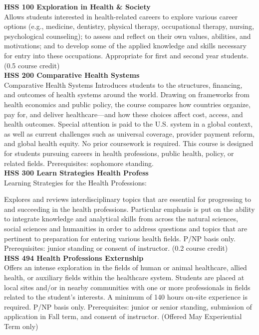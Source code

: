 \documentclass[
  letterpaper,
]{scrbook}
\begin{document}
\textbf{HSS 100 Exploration in Health \& Society}\\
Allows students interested in health-related careers to explore various
career options (e.g., medicine, dentistry, physical therapy,
occupational therapy, nursing, psychological counseling); to assess and
reflect on their own values, abilities, and motivations; and to develop
some of the applied knowledge and skills necessary for entry into these
occupations. Appropriate for first and second year students. (0.5 course
credit)\\
\textbf{HSS 200 Comparative Health Systems}\\
Comparative Health Systems Introduces students to the structures,
financing, and outcomes of health systems around the world. Drawing on
frameworks from health economics and public policy, the course compares
how countries organize, pay for, and deliver healthcare---and how these
choices affect cost, access, and health outcomes. Special attention is
paid to the U.S. system in a global context, as well as current
challenges such as universal coverage, provider payment reform, and
global health equity. No prior coursework is required. This course is
designed for students pursuing careers in health professions, public
health, policy, or related fields. Prerequisites: sophomore standing.\\
\textbf{HSS 300 Learn Strategies Health Profess}\\
Learning Strategies for the Health Professions:

Explores and reviews interdisciplinary topics that are essential for
progressing to and succeeding in the health professions. Particular
emphasis is put on the ability to integrate knowledge and analytical
skills from across the natural sciences, social sciences and humanities
in order to address questions and topics that are pertinent to
preparation for entering various health fields. P/NP basis only.
Prerequisites: junior standing or consent of instructor. (0.2 course
credit)\\
\textbf{HSS 494 Health Professions Externship}\\
Offers an intense exploration in the fields of human or animal
healthcare, allied health, or auxiliary fields within the healthcare
system. Students are placed at local sites and/or in nearby communities
with one or more professionals in fields related to the student's
interests. A minimum of 140 hours on-site experience is required. P/NP
basis only. Prerequisites: junior or senior standing, submission of
application in Fall term, and consent of instructor. (Offered May
Experiential Term only)
\end{document}
